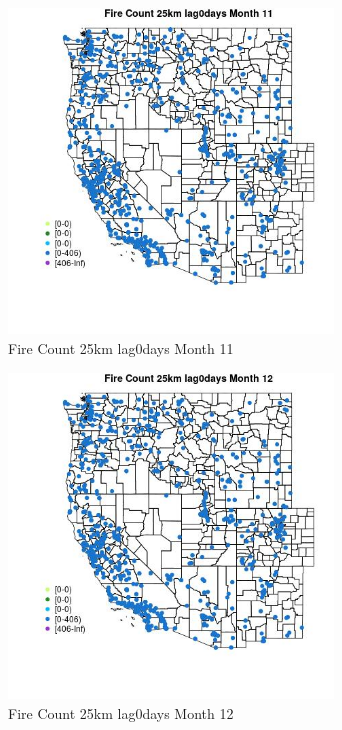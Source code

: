 \begin{figure} 
\centering  
\includegraphics[width=0.77\textwidth]{Code_Outputs/Report_ML_input_PM25_Step4_part_f_de_duplicated_aves_prioritize_24hr_obswNAs_MapObsMo11Fire_Count_25km_lag0days.jpg} 
\caption{\label{fig:Report_ML_input_PM25_Step4_part_f_de_duplicated_aves_prioritize_24hr_obswNAsMapObsMo11Fire_Count_25km_lag0days}Fire Count 25km lag0days Month 11} 
\end{figure} 
 

\begin{figure} 
\centering  
\includegraphics[width=0.77\textwidth]{Code_Outputs/Report_ML_input_PM25_Step4_part_f_de_duplicated_aves_prioritize_24hr_obswNAs_MapObsMo12Fire_Count_25km_lag0days.jpg} 
\caption{\label{fig:Report_ML_input_PM25_Step4_part_f_de_duplicated_aves_prioritize_24hr_obswNAsMapObsMo12Fire_Count_25km_lag0days}Fire Count 25km lag0days Month 12} 
\end{figure} 
 

